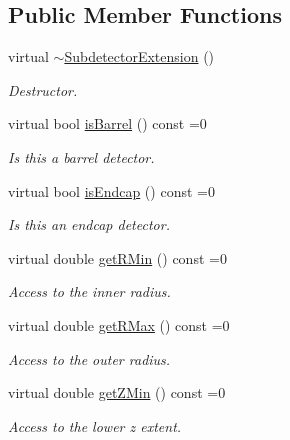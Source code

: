 \subsection*{Public Member Functions}
\begin{DoxyCompactItemize}
\item 
virtual \hyperlink{class_d_d4hep_1_1_d_d_rec_1_1_subdetector_extension_aa1aec61c92f4005d502f9419050f1b9b}{$\sim$SubdetectorExtension} ()
\begin{DoxyCompactList}\small\item\em Destructor. \item\end{DoxyCompactList}\item 
virtual bool \hyperlink{class_d_d4hep_1_1_d_d_rec_1_1_subdetector_extension_a12be99462aa14feba6df7eed02468994}{isBarrel} () const =0
\begin{DoxyCompactList}\small\item\em Is this a barrel detector. \item\end{DoxyCompactList}\item 
virtual bool \hyperlink{class_d_d4hep_1_1_d_d_rec_1_1_subdetector_extension_a57a044e743f899391ac4a89fc0035e08}{isEndcap} () const =0
\begin{DoxyCompactList}\small\item\em Is this an endcap detector. \item\end{DoxyCompactList}\item 
virtual double \hyperlink{class_d_d4hep_1_1_d_d_rec_1_1_subdetector_extension_a2de40b96e752aee9d68559657c8b7874}{getRMin} () const =0
\begin{DoxyCompactList}\small\item\em Access to the inner radius. \item\end{DoxyCompactList}\item 
virtual double \hyperlink{class_d_d4hep_1_1_d_d_rec_1_1_subdetector_extension_a6d7b6e1818a7ca5054279ea5d372b7f4}{getRMax} () const =0
\begin{DoxyCompactList}\small\item\em Access to the outer radius. \item\end{DoxyCompactList}\item 
virtual double \hyperlink{class_d_d4hep_1_1_d_d_rec_1_1_subdetector_extension_a5229b92c90c65a76156b5ea082aa0301}{getZMin} () const =0
\begin{DoxyCompactList}\small\item\em Access to the lower z extent. \item\end{DoxyCompactList}\item 

\end{DoxyCompactItemize}
